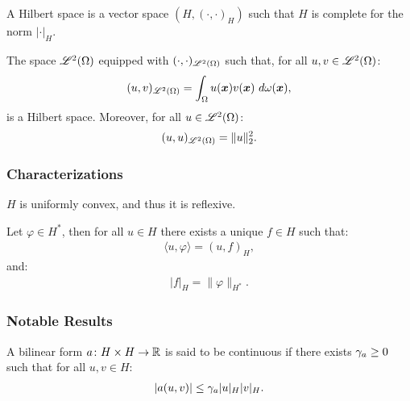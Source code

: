 \begin{definition} %
    A Hilbert space is a vector space $(H, (\cdot, \cdot)_H)$ such that $H$ is complete for the norm $\lvert \cdot \rvert_H$.
\end{definition}

\begin{remark}
    The space $\mathscr{L}^{2}(\Omega)$ equipped with $(\cdot, \cdot)_{\mathscr{L}^{2}(\Omega)}$ such that, for all $u, v \in \mathscr{L}^{2}(\Omega)$:
    \begin{align}
        (u, v)_{\mathscr{L}^{2}(\Omega)} = \int_{\Omega} u(\bm{x}) v(\bm{x}) ~ d \omega(\bm{x}),
    \end{align}
    is a Hilbert space. Moreover, for all $u \in \mathscr{L}^{2}(\Omega)$:
    \begin{align}
        (u, u)_{\mathscr{L}^{2}(\Omega)} = \lVert u \rVert_2^2.
    \end{align}
\end{remark}

\subsubsection{Characterizations}

\begin{theorem}
    $H$ is uniformly convex, and thus it is reflexive.
\end{theorem}

\begin{theorem}
    Let $\varphi \in H^*$, then for all $u \in H$ there exists a unique $f \in H$ such that:
    \begin{align}
        \langle u, \varphi \rangle = (u, f)_H,
    \end{align}
    and:
    \begin{align}
        \lvert f \rvert_H = \lVert \varphi \rVert_{H^*}.
    \end{align}
\end{theorem}

\subsubsection{Notable Results}

\begin{definition}
    A bilinear form $a \colon H \times H \rightarrow \mathbb{R}$ is said to be continuous if there exists $\gamma_{a} \geq 0$ such that for all $u, v \in H$:
    \begin{align}
        \lvert a(u, v) \rvert \leq \gamma_{a} \lvert u \rvert_H \lvert v \rvert_H.
    \end{align}
\end{definition}

